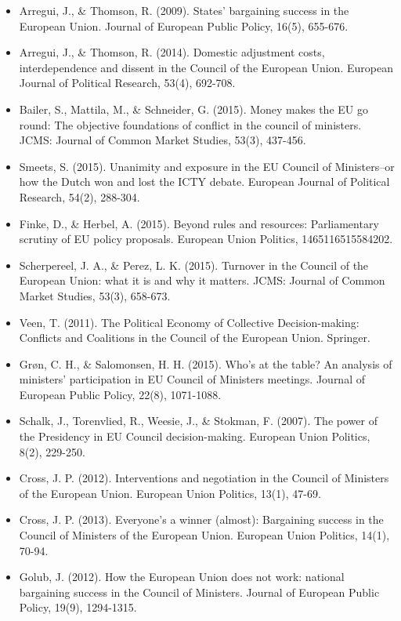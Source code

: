\begin{itemize}
	\item Arregui, J., \& Thomson, R. (2009). States' bargaining success in the European Union. Journal of European Public Policy, 16(5), 655-676.
	\item Arregui, J., \& Thomson, R. (2014). Domestic adjustment costs, interdependence and dissent in the Council of the European Union. European Journal of Political Research, 53(4), 692-708.
	\item Bailer, S., Mattila, M., \& Schneider, G. (2015). Money makes the EU go round: The objective foundations of conflict in the council of ministers. JCMS: Journal of Common Market Studies, 53(3), 437-456.
	\item Smeets, S. (2015). Unanimity and exposure in the EU Council of Ministers–or how the Dutch won and lost the ICTY debate. European Journal of Political Research, 54(2), 288-304.
	\item Finke, D., \& Herbel, A. (2015). Beyond rules and resources: Parliamentary scrutiny of EU policy proposals. European Union Politics, 1465116515584202.
	\item Scherpereel, J. A., \& Perez, L. K. (2015). Turnover in the Council of the European Union: what it is and why it matters. JCMS: Journal of Common Market Studies, 53(3), 658-673.
	\item Veen, T. (2011). The Political Economy of Collective Decision-making: Conflicts and Coalitions in the Council of the European Union. Springer.
	\item Gr{\o}n, C. H., \& Salomonsen, H. H. (2015). Who's at the table? An analysis of ministers’ participation in EU Council of Ministers meetings. Journal of European Public Policy, 22(8), 1071-1088.
	\item Schalk, J., Torenvlied, R., Weesie, J., \& Stokman, F. (2007). The power of the Presidency in EU Council decision-making. European Union Politics, 8(2), 229-250.
	\item Cross, J. P. (2012). Interventions and negotiation in the Council of Ministers of the European Union. European Union Politics, 13(1), 47-69.
	\item Cross, J. P. (2013). Everyone’s a winner (almost): Bargaining success in the Council of Ministers of the European Union. European Union Politics, 14(1), 70-94.
	\item Golub, J. (2012). How the European Union does not work: national bargaining success in the Council of Ministers. Journal of European Public Policy, 19(9), 1294-1315.

\end{itemize}
